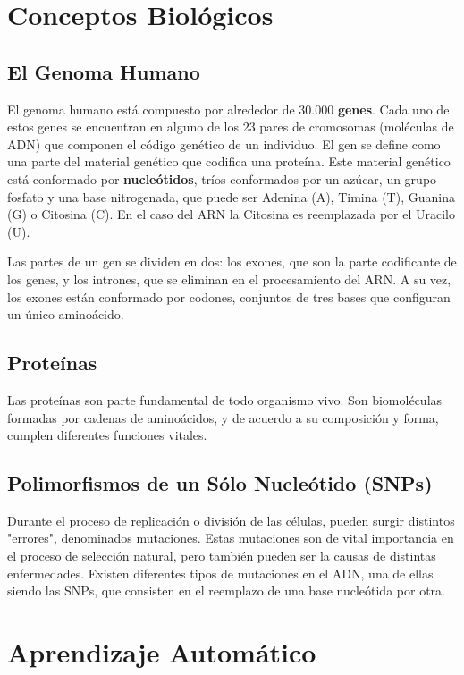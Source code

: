\section{Conceptos Biológicos}

\subsection{El Genoma Humano}

El genoma humano está compuesto por alrededor de 30.000 \textbf{genes}. Cada uno de estos genes se encuentran en alguno de los 23 pares de cromosomas (moléculas de ADN) que componen el código genético de un individuo. 
El gen se define como una parte del material genético que codifica una proteína. Este material genético está conformado por \textbf{nucleótidos}, tríos conformados por un azúcar, un grupo fosfato y una base nitrogenada, que puede ser Adenina (A), Timina (T), Guanina (G) o Citosina (C). En el caso del ARN la Citosina es reemplazada por el Uracilo (U).

Las partes de un gen se dividen en dos: los exones, que son la parte codificante de los genes, y los intrones, que se eliminan en el procesamiento del ARN. 
A su vez, los exones están conformado por codones, conjuntos de tres bases que configuran un único aminoácido. 


\subsection{Proteínas}

Las proteínas son parte fundamental de todo organismo vivo. Son biomoléculas formadas por cadenas de aminoácidos, y de acuerdo a su composición y forma, cumplen diferentes funciones vitales.

\subsection{Polimorfismos de un Sólo Nucleótido (SNPs)}

Durante el proceso de replicación o división de las células, pueden surgir distintos "errores", denominados mutaciones. Estas mutaciones son de vital importancia en el proceso de selección natural, pero también pueden ser la causas de distintas enfermedades. Existen diferentes tipos de mutaciones en el ADN, una de ellas siendo las SNPs, que consisten en el reemplazo de una base nucleótida por otra.


\section{Aprendizaje Automático}

